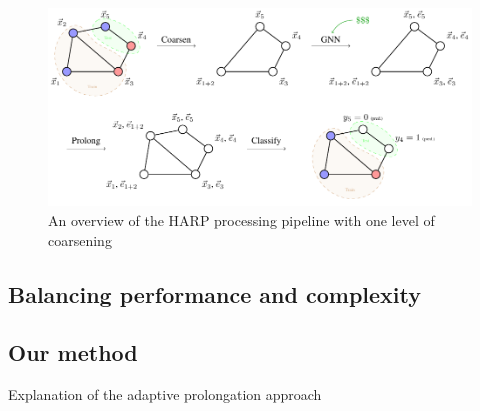 \begin{figure}
  \centering
  \includegraphics[width=\linewidth]{images/harp-overview/harp-overview.pdf}
  \caption{An overview of the HARP processing pipeline with one level of coarsening}
  \label{fig:harp-overview}
\end{figure}

\subsection{Balancing performance and complexity}

\subsection{Our method}
Explanation of the adaptive prolongation approach
